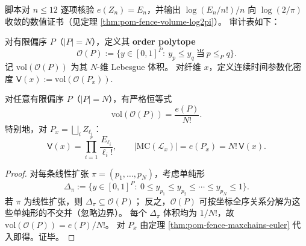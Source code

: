 \begin{remark}[有限窗审计：\(e(Z_n)=E_n\) 与体积常数]\label{rem:pom-fence-euler-volume-audit}
脚本对 \(n\le 12\) 逐项核验 \(e(Z_n)=E_n\)，并输出 \(\log(E_n/n!)/n\) 向 \(\log(2/\pi)\) 收敛的数值证书（见定理 \ref{thm:pom-fence-volume-log2pi}）。
审计表如下：

\end{remark}

\begin{definition}\label{def:pom-order-polytope-volume}
对有限偏序 \(P\)（\(|P|=N\)），定义其 \textbf{order polytope}
\[
\mathcal O(P):=\{y\in[0,1]^P:\ y_p\le y_q\ \text{当}\ p\le_P q\}.
\]
记 \(\mathrm{vol}(\mathcal O(P))\) 为其 \(N\)-维 Lebesgue 体积。
对纤维 \(x\)，定义连续时间参数化密度
\(
\mathsf V(x):=\mathrm{vol}(\mathcal O(P_x)).
\)
\end{definition}

\begin{theorem}[离散—连续同一性：线性扩张数 = 归一化体积]\label{thm:pom-order-polytope-volume-linext}
对任意有限偏序 \(P\)（\(|P|=N\)），有严格恒等式
\[
\mathrm{vol}(\mathcal O(P))=\frac{e(P)}{N!}.
\]
特别地，对 \(P_x=\bigsqcup_i Z_{\ell_i}\)：
\[
\mathsf V(x)=\prod_{i=1}^r \frac{E_{\ell_i}}{\ell_i!},
\qquad
|\mathrm{MC}(\mathcal L_x)|=e(P_x)=N!\,\mathsf V(x).
\]
\end{theorem}
\begin{proof}
对每条线性扩张 \(\pi=(p_1,\dots,p_N)\)，考虑单纯形
\[
\Delta_\pi:=\{y\in[0,1]^P:\ 0\le y_{p_1}\le y_{p_2}\le\cdots\le y_{p_N}\le 1\}.
\]
若 \(\pi\) 为线性扩张，则 \(\Delta_\pi\subseteq \mathcal O(P)\)；
反之，\(\mathcal O(P)\) 可按坐标全序关系分解为这些单纯形的不交并（忽略边界）。
每个 \(\Delta_\pi\) 体积均为 \(1/N!\)，故 \(\mathrm{vol}(\mathcal O(P))=e(P)/N!\)。
对 \(P_x\) 由定理 \ref{thm:pom-fence-maxchains-euler} 代入即得。证毕。
\end{proof}

